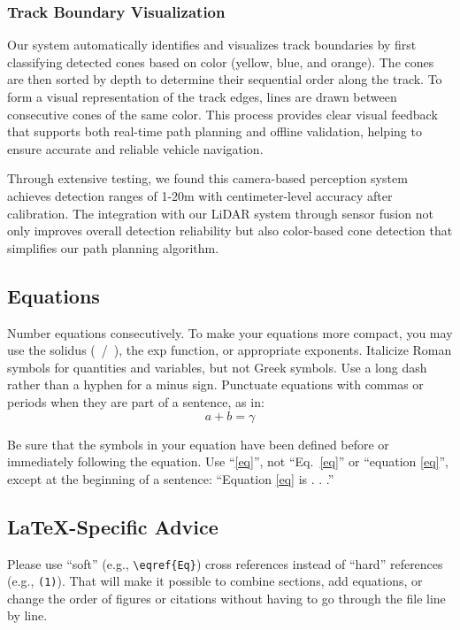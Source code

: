 \documentclass[conference]{IEEEtran}
\begin{document}
\subsubsection{Track Boundary Visualization}
Our system automatically identifies and visualizes track boundaries by first classifying detected cones based on color (yellow, blue, and orange). The cones are then sorted by depth to determine their sequential order along the track. To form a visual representation of the track edges, lines are drawn between consecutive cones of the same color. This process provides clear visual feedback that supports both real-time path planning and offline validation, helping to ensure accurate and reliable vehicle navigation.

\vspace{0.4em}
Through extensive testing, we found this camera-based perception system achieves detection ranges of 1-20m with centimeter-level accuracy after calibration. The integration with our LiDAR system through sensor fusion not only improves overall detection reliability but also color-based cone detection that simplifies our path planning algorithm.

\subsection{Equations}
Number equations consecutively. To make your 
equations more compact, you may use the solidus (~/~), the exp function, or 
appropriate exponents. Italicize Roman symbols for quantities and variables, 
but not Greek symbols. Use a long dash rather than a hyphen for a minus 
sign. Punctuate equations with commas or periods when they are part of a 
sentence, as in:
\begin{equation}
a+b=\gamma\label{eq}
\end{equation}

Be sure that the 
symbols in your equation have been defined before or immediately following 
the equation. Use ``\eqref{eq}'', not ``Eq.~\eqref{eq}'' or ``equation \eqref{eq}'', except at 
the beginning of a sentence: ``Equation \eqref{eq} is . . .''

\subsection{\LaTeX-Specific Advice}

Please use ``soft'' (e.g., \verb|\eqref{Eq}|) cross references instead
of ``hard'' references (e.g., \verb|(1)|). That will make it possible
to combine sections, add equations, or change the order of figures or
citations without having to go through the file line by line.
\end{document}
